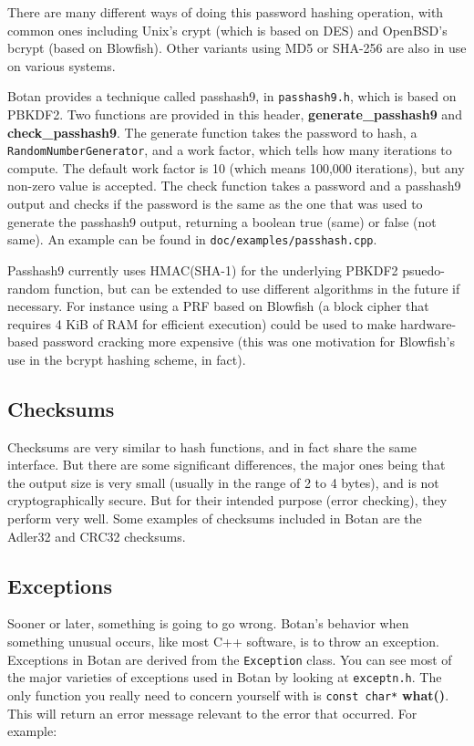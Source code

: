 \documentclass{article}
\newcommand{\filename}[1]{\texttt{#1}}
\newcommand{\function}[1]{\textbf{#1}}
\newcommand{\type}[1]{\texttt{#1}}
\begin{document}
There are many different ways of doing this password hashing
operation, with common ones including Unix's crypt (which is based on
DES) and OpenBSD's bcrypt (based on Blowfish). Other variants using
MD5 or SHA-256 are also in use on various systems.

Botan provides a technique called passhash9, in
\filename{passhash9.h}, which is based on PBKDF2. Two functions are
provided in this header, \function{generate\_passhash9} and
\function{check\_passhash9}.  The generate function takes the password
to hash, a \type{RandomNumberGenerator}, and a work factor, which
tells how many iterations to compute. The default work factor is 10
(which means 100,000 iterations), but any non-zero value is accepted.
The check function takes a password and a passhash9 output and checks
if the password is the same as the one that was used to generate the
passhash9 output, returning a boolean true (same) or false (not same).
An example can be found in \filename{doc/examples/passhash.cpp}.

Passhash9 currently uses HMAC(SHA-1) for the underlying PBKDF2
psuedo-random function, but can be extended to use different
algorithms in the future if necessary. For instance using a PRF based
on Blowfish (a block cipher that requires 4 KiB of RAM for efficient
execution) could be used to make hardware-based password cracking more
expensive (this was one motivation for Blowfish's use in the bcrypt
hashing scheme, in fact).

\subsection{Checksums}

Checksums are very similar to hash functions, and in fact share the same
interface. But there are some significant differences, the major ones being
that the output size is very small (usually in the range of 2 to 4 bytes), and
is not cryptographically secure. But for their intended purpose (error
checking), they perform very well. Some examples of checksums included in Botan
are the Adler32 and CRC32 checksums.

\subsection{Exceptions}

Sooner or later, something is going to go wrong. Botan's behavior when
something unusual occurs, like most C++ software, is to throw an exception.
Exceptions in Botan are derived from the \type{Exception} class. You can see
most of the major varieties of exceptions used in Botan by looking at
\filename{exceptn.h}. The only function you really need to concern yourself
with is \type{const char*} \function{what()}. This will return an error message
relevant to the error that occurred. For example:
\end{document}
